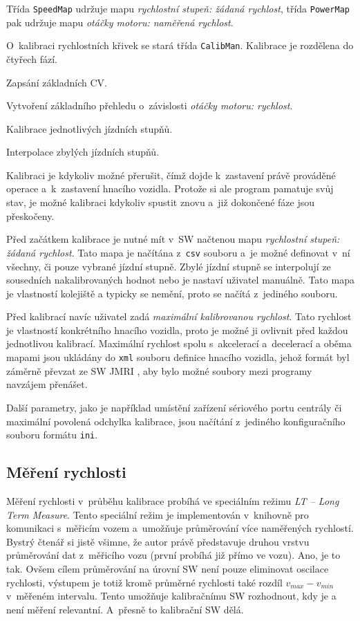 Třída \texttt{SpeedMap} udržuje mapu \textit{rychlostní stupeň: žádaná rychlost},
třída \texttt{PowerMap} pak udržuje mapu \textit{otáčky motoru: naměřená rychlost}.

O~kalibraci rychlostních křivek se stará třída \texttt{CalibMan}. Kalibrace
je rozdělena do čtyřech fází.

\begin{compactenum}
\item Zapsání základních CV.
\item Vytvoření základního přehledu o~závislosti \textit{otáčky motoru: rychlost}.
\item Kalibrace jednotlivých jízdních stupňů.
\item Interpolace zbylých jízdních stupňů.
\end{compactenum}

Kalibraci je kdykoliv možné přerušit, čímž dojde k~zastavení právě prováděné
operace a~k~zastavení hnacího vozidla. Protože si ale program pamatuje svůj
stav, je možné kalibraci kdykoliv spustit znovu a~již dokončené fáze jsou
přeskočeny.

Před začátkem kalibrace je nutné mít v~SW načtenou mapu \textit{rychlostní
stupeň: žádaná rychlost}. Tato mapa je načítána z~\texttt{csv} souboru a~je
možné definovat v~ní všechny, či pouze vybrané jízdní stupně. Zbylé jízdní
stupně se interpolují ze sousedních nakalibrovaných hodnot nebo je nastaví
uživatel manuálně. Tato mapa je vlastností kolejiště a typicky se nemění, proto
se načítá z~jediného souboru.

Před kalibrací navíc uživatel zadá \textit{maximální kalibrovanou rychlost}.
Tato rychlost je vlastností konkrétního hnacího vozidla, proto je možné ji
ovlivnit před každou jednotlivou kalibrací. Maximální rychlost spolu
s~akcelerací a~decelerací a oběma mapami jsou ukládány do \texttt{xml} souboru
definice hnacího vozidla, jehož formát byl záměrně převzat ze SW JMRI
\cite{jmri:web}, aby bylo možné soubory mezi programy navzájem přenášet.

Další parametry, jako je například umístění zařízení sériového portu centrály
či maximální povolená odchylka kalibrace, jsou načítání z~jediného
konfiguračního souboru formátu \texttt{ini}.

\subsection{Měření rychlosti}
\label{sec:ac:lt-measure}

Měření rychlosti v~průběhu kalibrace probíhá ve speciálním režimu \textit{LT --
Long Term Measure}. Tento speciální režim je implementován v~knihov\-ně pro komunikaci
s~měřicím vozem a~umožňuje průměrování více naměřených rychlostí. Bystrý čtenář si
jistě všimne, že autor právě představuje druhou vrstvu průměrování dat
z~měřicího vozu (první probíhá již přímo ve vozu). Ano, je to tak. Ovšem cílem
průměrování na úrovní SW není pouze eliminovat oscilace rychlosti, výstupem
je totiž kromě průměrné rychlosti také rozdíl $v_{max} - v_{min}$ v~měřeném
intervalu. Tento  umožňuje kalibračnímu SW rozhodnout, kdy
je a není měření relevantní. A~přesně to kalibrační SW dělá.

